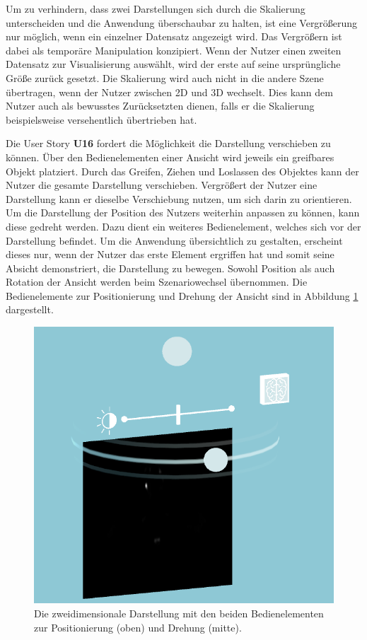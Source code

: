 Um zu verhindern, dass zwei Darstellungen sich durch die Skalierung unterscheiden und die Anwendung überschaubar zu halten, ist eine Vergrößerung nur möglich, wenn ein einzelner Datensatz angezeigt wird. 
Das Vergrößern ist dabei als temporäre Manipulation konzipiert. Wenn der Nutzer einen zweiten Datensatz zur Visualisierung auswählt, wird der erste auf seine ursprüngliche Größe zurück gesetzt. Die Skalierung wird auch nicht in die andere Szene übertragen, wenn der Nutzer zwischen 2D und 3D wechselt. Dies kann dem Nutzer auch als bewusstes Zurücksetzten dienen, falls er die Skalierung beispielsweise versehentlich übertrieben hat.

Die User Story \textbf{U16} fordert die Möglichkeit die Darstellung verschieben zu können. %
Über den Bedienelementen einer Ansicht wird jeweils ein greifbares Objekt platziert. Durch das Greifen, Ziehen und Loslassen des Objektes kann der Nutzer die gesamte Darstellung verschieben. %
Vergrößert der Nutzer eine Darstellung kann er dieselbe Verschiebung nutzen, um sich darin zu orientieren. 
Um die Darstellung der Position des Nutzers weiterhin anpassen zu können, kann diese gedreht werden. Dazu dient ein weiteres Bedienelement, welches sich vor der Darstellung befindet. Um die Anwendung übersichtlich zu gestalten, erscheint dieses nur, wenn der Nutzer das erste Element ergriffen hat und somit seine Absicht demonstriert, die Darstellung zu bewegen. 
Sowohl Position als auch Rotation der Ansicht werden beim Szenariowechsel übernommen.
Die Bedienelemente zur Positionierung und Drehung der Ansicht sind in Abbildung \ref{img:3dPos} dargestellt. 

\begin{figure}[!htb]
	\centering
	\includegraphics[width=0.5\linewidth]{images/mARt_turn.png}
	\caption{Die zweidimensionale Darstellung mit den beiden Bedienelementen zur Positionierung (oben) und Drehung (mitte).}
	\label{img:3dPos}
\end{figure}
\FloatBarrier

